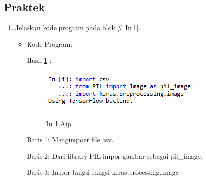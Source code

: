 \subsection{Praktek}
\begin{enumerate}
\item Jelaskan kode program pada blok \# In[1].
\begin{itemize}
\item Kode Program:

\par Hasil \ref{in1aip} :
\begin{figure}[!hbtp]
\centering
\includegraphics[scale=0.7]{figures/AIP/prak1.PNG}
\caption{In 1 Aip}
\label{in1aip}
\end{figure}
\par Baris 1: Mengimpoer file csv.
\par Baris 2: Dari library PIL impor gambar sebagai pil\_image.
\par Baris 3: Impor fungsi fungsi keras.processing.image
\end{itemize}
\par


\end{enumerate}
